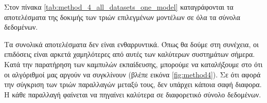 Στον πίνακα \ref{tab:method_4_all_datasets_one_model} καταγράφονται τα αποτελέσματα της δοκιμής των τριών επιλεγμένων μοντέλων σε όλα τα σύνολα δεδομένων.
\begin{table}[h]
    \begin{center}
    \end{center}
    \caption[]{\label{tab:method_4_all_datasets_one_model}Συνολικά αποτελέσματα δοκιμής των τριών μοντέλων σε όλα τα σύνολα δεδομένων που υποστηρίζει η τέταρτη μέθοδος για 50 εποχές. Στα πειράματα με αστερίσκο (*) παρατηρήσαμε αστάθεια.} 
\end{table}

Τα συνολικά αποτελέσματα δεν είναι ενθαρρυντικά. Όπως θα δούμε στη συνέχεια, οι επιδόσεις είναι αρκετά χαμηλότερες από αυτές των καλύτερων συστημάτων σήμερα. Κατά την παρατήρηση των καμπυλών εκπαίδευσης, μπορούμε να καταλήξουμε στο ότι οι αλγόριθμοί μας αργούν να συγκλίνουν (βλέπε εικόνα \ref{fig:method4}). Σε ότι αφορά την σύγκριση των τριών παραλλαγών μεταξύ τους, δεν υπάρχει κάποια σαφή διαφορα. Η κάθε παραλλαγή φαίνεται να πηγαίνει καλύτερα σε διαφορετικό σύνολο δεδομένων.\par

